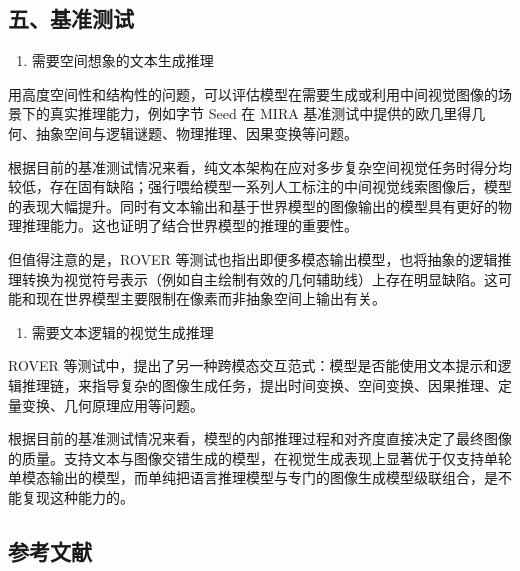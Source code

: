 \hypertarget{ux4e94ux57faux51c6ux6d4bux8bd5}{%
\subsection{五、基准测试}\label{ux4e94ux57faux51c6ux6d4bux8bd5}}

\begin{enumerate}
\def\labelenumi{\arabic{enumi}.}
\tightlist
\item
  需要空间想象的文本生成推理
\end{enumerate}

用高度空间性和结构性的问题，可以评估模型在需要生成或利用中间视觉图像的场景下的真实推理能力，例如字节 Seed 在 MIRA 基准测试中提供的欧几里得几何、抽象空间与逻辑谜题、物理推理、因果变换等问题。

根据目前的基准测试情况来看，纯文本架构在应对多步复杂空间视觉任务时得分均较低，存在固有缺陷；强行喂给模型一系列人工标注的中间视觉线索图像后，模型的表现大幅提升。同时有文本输出和基于世界模型的图像输出的模型具有更好的物理推理能力。这也证明了结合世界模型的推理的重要性。

但值得注意的是，ROVER 等测试也指出即便多模态输出模型，也将抽象的逻辑推理转换为视觉符号表示（例如自主绘制有效的几何辅助线）上存在明显缺陷。这可能和现在世界模型主要限制在像素而非抽象空间上输出有关。

\begin{enumerate}
\def\labelenumi{\arabic{enumi}.}
\setcounter{enumi}{1}
\tightlist
\item
  需要文本逻辑的视觉生成推理
\end{enumerate}

ROVER 等测试中，提出了另一种跨模态交互范式：模型是否能使用文本提示和逻辑推理链，来指导复杂的图像生成任务，提出时间变换、空间变换、因果推理、定量变换、几何原理应用等问题。

根据目前的基准测试情况来看，模型的内部推理过程和对齐度直接决定了最终图像的质量。支持文本与图像交错生成的模型，在视觉生成表现上显著优于仅支持单轮单模态输出的模型，而单纯把语言推理模型与专门的图像生成模型级联组合，是不能复现这种能力的。

\hypertarget{ux53c2ux8003ux6587ux732e-198}{%
\subsection{参考文献}\label{ux53c2ux8003ux6587ux732e-198}}

